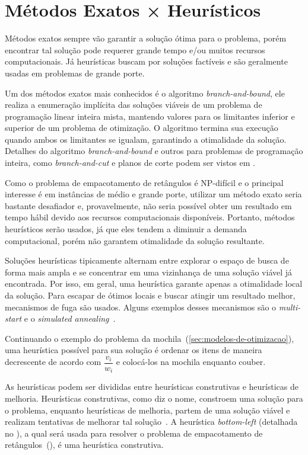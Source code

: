 \section{Métodos Exatos × Heurísticos}\label{sec:metodos-exatos-heuristicos}

Métodos exatos sempre vão garantir a solução ótima para o problema, porém encontrar
tal solução pode requerer grande tempo e/ou muitos recursos computacionais.
Já heurísticas buscam por soluções factíveis e são geralmente usadas em problemas de grande porte.

Um dos métodos exatos mais conhecidos é o algoritmo \textit{branch-and-bound}, ele realiza a
enumeração implícita das soluções viáveis de um problema de programação linear inteira mista,
mantendo valores para os limitantes inferior e superior de um problema de otimização.
O algoritmo termina sua execução quando ambos os limitantes se igualam, garantindo a otimalidade
da solução.
Detalhes do algoritmo \textit{branch-and-bound} e outros para problemas de programação inteira,
como \textit{branch-and-cut} e planos de corte podem ser vistos em .

Como o problema de empacotamento de retângulos é NP-difícil e o principal interesse é em instâncias
de médio e grande porte, utilizar um método exato seria bastante desafiador e, provavelmente,
não seria possível obter um resultado em tempo hábil devido aos recursos computacionais disponíveis.
Portanto, métodos heurísticos serão usados, já que eles tendem a diminuir a demanda computacional,
porém não garantem otimalidade da solução resultante.

Soluções heurísticas tipicamente alternam entre explorar o espaço de busca de forma mais ampla
e se concentrar em uma vizinhança de uma solução viável já encontrada.
Por isso, em geral, uma heurística garante apenas a otimalidade local da solução.
Para escapar de ótimos locais e buscar atingir um resultado melhor, mecanismos de fuga são usados.
Alguns exemplos desses mecanismos são o \textit{multi-start} e o \textit{simulated annealing}~\cite{
    firat2020effective,rakotonirainy2020improved,hopper2001empirical}.

Continuando o exemplo do problema da mochila~(\cref{sec:modelos-de-otimizacao}), uma heurística
possível para sua solução é ordenar os itens de maneira decrescente de acordo com $\dfrac{v_i}{w_i}$
e colocá-los na mochila enquanto couber.

As heurísticas podem ser divididas entre heurísticas construtivas e heurísticas de melhoria.
Heurísticas construtivas, como diz o nome, constroem uma solução para o problema,
enquanto heurísticas de melhoria, partem de uma solução viável e realizam tentativas de
melhorar tal solução~\cite{michalewicz2013solve}.
A heurística \textit{bottom-left} (detalhada no ), a qual será usada para
resolver o problema de empacotamento de retângulos~(),
é uma heurística construtiva.